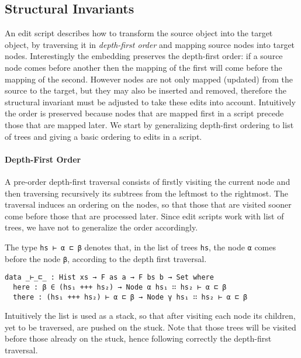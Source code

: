\documentclass[preprint]{sigplanconf}
\theoremstyle{plain}
\begin{document}
    \subsection{Structural  Invariants}
    An edit script describes how to transform the source object into
    the target object, by traversing it in \emph{depth-first order}
    and mapping source nodes into target nodes.
    Interestingly the embedding preserves the depth-first order: if a
    source node comes before another then the mapping of the first
    will come before the mapping of the second.    
    However nodes are not only mapped (updated) from the source to the
    target, but they may also be inserted and removed, therefore the
    structural invariant must be adjusted to take these edits into
    account.
    Intuitively the order is preserved because nodes that 
    are mapped first in a script precede those that are mapped later.
    We start by generalizing depth-first ordering to list of trees and
    giving a basic ordering to edits in a script.
    

    \paragraph{Depth-First Order}
    A pre-order depth-first traversal consists of firstly visiting the current node 
    and then traversing recursively its subtrees from the leftmost to the rightmost.
    The traversal induces an ordering on the nodes, so that those that
    are visited sooner come before those that are processed later.
    Since edit scripts work with list of trees, we have not to generalize the order accordingly.
    
    The type \texttt{hs ⊢ α ⊏ β} denotes that, in the list of trees \texttt{hs}, 
    the node \texttt{α} comes before the node \texttt{β}, according to the
    depth first traversal.

\begin{verbatim}
data _⊢_⊏_ : Hist xs → F as a → F bs b → Set where
  here : β ∈ (hs₁ +++ hs₂) → Node α hs₁ ∷ hs₂ ⊢ α ⊏ β
  there : (hs₁ +++ hs₂) ⊢ α ⊏ β → Node γ hs₁ ∷ hs₂ ⊢ α ⊏ β
\end{verbatim}

    Intuitively the list is used as a stack, so that after visiting
    each node its children, yet to be traversed, are pushed on the stuck.
    Note that those trees will be visited before those already on the stuck,
    hence following correctly the depth-first traversal.
\end{document}
